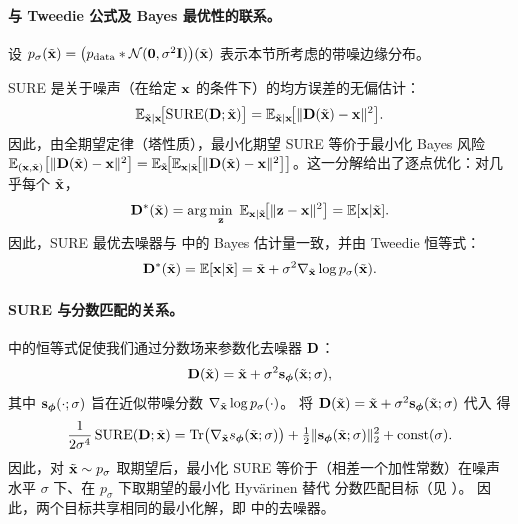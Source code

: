 \paragraph{与 Tweedie 公式及 Bayes 最优性的联系。}
设 $p_\sigma(\tilde{{\mathbf{x}}}) = \big(p_{\mathrm{data}} * \mathcal{N}(\mathbf{0}, \sigma^2 {\mathbf{I}})\big)(\tilde{{\mathbf{x}}})$ 表示本节所考虑的带噪边缘分布。


SURE 是关于噪声（在给定 ${\mathbf{x}}$ 的条件下）的均方误差的无偏估计：
\[
\mathbb{E}_{\tilde{{\mathbf{x}}}| {\mathbf{x}}}\!\big[\mathrm{SURE}({\mathbf{D}}; \tilde{{\mathbf{x}}})\big]
=
\mathbb{E}_{\tilde{{\mathbf{x}}}| {\mathbf{x}}}\!\big[\|{\mathbf{D}}(\tilde{{\mathbf{x}}})-{\mathbf{x}}\|^2\big].
\]
因此，由全期望定律（塔性质），最小化期望 SURE 等价于最小化 Bayes 风险
$\mathbb{E}_{({\mathbf{x}}, \tilde{{\mathbf{x}}})}\big[\|{\mathbf{D}}(\tilde{{\mathbf{x}}})-{\mathbf{x}}\|^2\big]
=\mathbb{E}_{\tilde{{\mathbf{x}}}}\!\big[\mathbb{E}_{{\mathbf{x}}| \tilde{{\mathbf{x}}}}\!\big[\|{\mathbf{D}}(\tilde{{\mathbf{x}}})-{\mathbf{x}}\|^2\big]\big]$。这一分解给出了逐点优化：对几乎每个 $\tilde{{\mathbf{x}}}$，
\[
{\mathbf{D}}^*(\tilde{{\mathbf{x}}})
=\arg\min_{\mathbf z}\ \mathbb{E}_{{\mathbf{x}}| \tilde{{\mathbf{x}}}}\!\big[\|\mathbf z-{\mathbf{x}}\|^2\big]
=\mathbb{E}[{\mathbf{x}}| \tilde{{\mathbf{x}}}].
\]
因此，SURE 最优去噪器与  中的 Bayes 估计量一致，并由 Tweedie 恒等式：
\begin{align}\label{eq:sure-tweedie-denoiser}
    {\mathbf{D}}^*(\tilde{{\mathbf{x}}})=\mathbb{E}[{\mathbf{x}}| \tilde{{\mathbf{x}}}]=\tilde{{\mathbf{x}}}+\sigma^2\nabla_{\tilde{{\mathbf{x}}}}\log p_\sigma(\tilde{{\mathbf{x}}}).
\end{align}




\paragraph{SURE 与分数匹配的关系。}
 中的恒等式促使我们通过分数场来参数化去噪器 ${\mathbf{D}}$：
\[
{\mathbf{D}}(\tilde{{\mathbf{x}}})=\tilde{{\mathbf{x}}}+\sigma^2{\mathbf{s}}_{\bm\phi}(\tilde{{\mathbf{x}}};\sigma),
\]
其中 ${\mathbf{s}}_{\bm\phi}(\cdot;\sigma)$ 旨在近似带噪分数
$\nabla_{\tilde{{\mathbf{x}}}}\log p_\sigma(\cdot)$。
将 ${\mathbf{D}}(\tilde{{\mathbf{x}}})=\tilde{{\mathbf{x}}}+\sigma^2 {\mathbf{s}}_{\bm\phi}(\tilde{{\mathbf{x}}};\sigma)$ 代入  得
\[
\frac{1}{2\sigma^4}\,\mathrm{SURE}({\mathbf{D}};\tilde{{\mathbf{x}}})
=
\operatorname{Tr}\!\big(\nabla_{\tilde{{\mathbf{x}}}} s_{\bm\phi}(\tilde{{\mathbf{x}}};\sigma)\big)
+\tfrac12\|{\mathbf{s}}_{\bm\phi}(\tilde{{\mathbf{x}}};\sigma)\|_2^2
+\text{const}(\sigma).
\]
因此，对 $\tilde{{\mathbf{x}}}\sim p_\sigma$ 取期望后，最小化 SURE
等价于（相差一个加性常数）在噪声水平 $\sigma$ 下、在 $p_\sigma$ 下取期望的最小化 Hyvärinen 替代
分数匹配目标（见 ）。
因此，两个目标共享相同的最小化解，即  中的去噪器。



